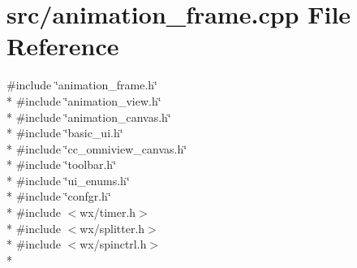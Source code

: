 \hypertarget{a00170}{\section{src/animation\-\_\-frame.cpp File Reference}
\label{a00170}
}
{\ttfamily \#include \char`\"{}animation\-\_\-frame.\-h\char`\"{}}\\*
{\ttfamily \#include \char`\"{}animation\-\_\-view.\-h\char`\"{}}\\*
{\ttfamily \#include \char`\"{}animation\-\_\-canvas.\-h\char`\"{}}\\*
{\ttfamily \#include \char`\"{}basic\-\_\-ui.\-h\char`\"{}}\\*
{\ttfamily \#include \char`\"{}cc\-\_\-omniview\-\_\-canvas.\-h\char`\"{}}\\*
{\ttfamily \#include \char`\"{}toolbar.\-h\char`\"{}}\\*
{\ttfamily \#include \char`\"{}ui\-\_\-enums.\-h\char`\"{}}\\*
{\ttfamily \#include \char`\"{}confgr.\-h\char`\"{}}\\*
{\ttfamily \#include $<$wx/timer.\-h$>$}\\*
{\ttfamily \#include $<$wx/splitter.\-h$>$}\\*
{\ttfamily \#include $<$wx/spinctrl.\-h$>$}\\*
